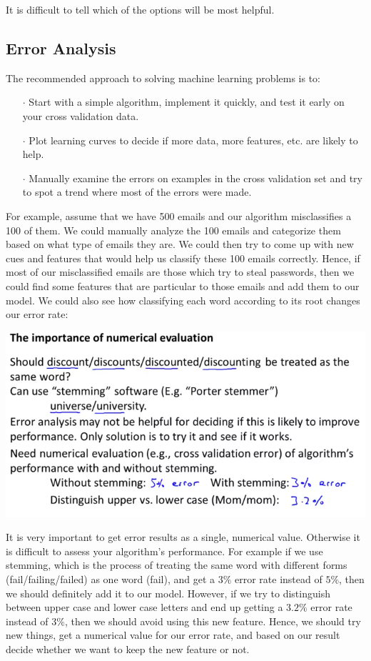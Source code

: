 \documentclass[UTF8]{article}
\begin{document}
It is difficult to tell which of the options will be most helpful.

\subsection{Error Analysis}

The recommended approach to solving machine learning problems is to:

\begin{itemize}
\item[$\cdot$]Start with a simple algorithm, implement it quickly, and test it early on your cross validation data.
\item[$\cdot$]Plot learning curves to decide if more data, more features, etc. are likely to help.
\item[$\cdot$]Manually examine the errors on examples in the cross validation set and try to spot a trend where most of the errors were made.
\end{itemize}

For example, assume that we have 500 emails and our algorithm misclassifies a 100 of them. We could manually analyze the 100 emails and categorize them based on what type of emails they are. We could then try to come up with new cues and features that would help us classify these 100 emails correctly. Hence, if most of our misclassified emails are those which try to steal passwords, then we could find some features that are particular to those emails and add them to our model. We could also see how classifying each word according to its root changes our error rate:

\includegraphics[width = \textwidth]{NotePics/11_2_1.png}

It is very important to get error results as a single, numerical value. Otherwise it is difficult to assess your algorithm's performance. For example if we use stemming, which is the process of treating the same word with different forms (fail/failing/failed) as one word (fail), and get a $3\%$ error rate instead of $5\%$, then we should definitely add it to our model. However, if we try to distinguish between upper case and lower case letters and end up getting a $3.2\%$ error rate instead of $3\%$, then we should avoid using this new feature. Hence, we should try new things, get a numerical value for our error rate, and based on our result decide whether we want to keep the new feature or not.
\end{document}
